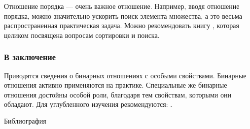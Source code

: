 Отношение порядка --- очень важное отношение. Например, вводя отношение порядка, можно значительно ускорить поиск элемента множества, а это весьма распространенная практическая задача. Можно рекомендовать книгу \cite{bib:knuth:artOfProgramming3}, которая целиком посвящена вопросам сортировки и поиска.

\appendix


\begin{frame}
    \frametitle{В заключение}
    
    Приводятся сведения о бинарных отношениях с особыми свойствами. Бинарные отношения активно применяются на практике. Специальные же бинарные отношения достойны особой роли, благодаря тем свойствам, которыми они обладают. Для углубленного изучения рекомендуются: \cite{bib:novic:discrmathprogrammer,bib:sudoplatov:discrmath,bib:shaporev:discretemath}.
\end{frame}


\begin{frame}[allowframebreaks]{Библиография}
    
    
\end{frame}

